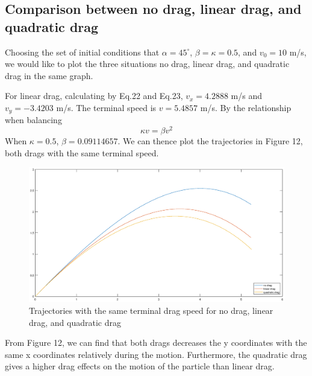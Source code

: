\documentclass[12pt]{report}
\begin{document}
\subsection{Comparison between no drag, linear drag, and quadratic drag}
Choosing the set of initial conditions that $\alpha=45^\circ$, $\beta=\kappa=0.5$, and $v_0=10$ m/s, we would like to plot the three situations no drag, linear drag, and quadratic drag in the same graph.

For linear drag, calculating by Eq.22 and Eq.23, $v_x=4.2888$ m/s and $v_y=-3.4203$ m/s. The terminal speed is $v=5.4857$ m/s. By the relationship when balancing
\begin{equation}
    \kappa v=\beta v^2
\end{equation}
When $\kappa=0.5$, $\beta=0.09114657$. We can thence plot the trajectories in Figure 12, both drags with the same terminal speed.
\begin{figure}[H]
    \centering
    \includegraphics[width=1\linewidth]{2-3.eps}
    \caption{Trajectories with the same terminal drag speed for no drag, linear drag, and quadratic drag}
\end{figure}
From Figure 12, we can find that both drags decreases the y coordinates with the same x coordinates relatively during the motion. Furthermore, the quadratic drag gives a higher drag effects on the motion of the particle than linear drag.
\end{document}
